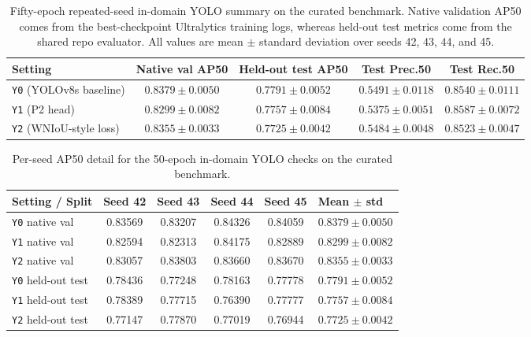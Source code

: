 \documentclass[10pt,a4paper]{article}
\begin{document}
\begin{table}[t]
  \centering
  \caption{Fifty-epoch repeated-seed in-domain YOLO summary on the curated benchmark. Native validation AP50 comes from the best-checkpoint Ultralytics training logs, whereas held-out test metrics come from the shared repo evaluator. All values are mean $\pm$ standard deviation over seeds 42, 43, 44, and 45.}
  \label{tab:app-curated-summary}
  \footnotesize
  \setlength{\tabcolsep}{4pt}
  \begin{tabularx}{\textwidth}{>{\raggedright\arraybackslash}p{} c c c c}
    \toprule
    Setting & Native val AP50 & Held-out test AP50 & Test Prec.50 & Test Rec.50 \\
    \midrule
    \texttt{Y0} (YOLOv8s baseline) & $0.8379 \pm 0.0050$ & $0.7791 \pm 0.0052$ & $0.5491 \pm 0.0118$ & $0.8540 \pm 0.0111$ \\
    \texttt{Y1} (P2 head) & $0.8299 \pm 0.0082$ & $0.7757 \pm 0.0084$ & $0.5375 \pm 0.0051$ & $0.8587 \pm 0.0072$ \\
    \texttt{Y2} (WNIoU-style loss) & $0.8355 \pm 0.0033$ & $0.7725 \pm 0.0042$ & $0.5484 \pm 0.0048$ & $0.8523 \pm 0.0047$ \\
    \bottomrule
  \end{tabularx}
\end{table}

\begin{table}[t]
  \centering
  \caption{Per-seed AP50 detail for the 50-epoch in-domain YOLO checks on the curated benchmark.}
  \label{tab:app-curated-perseed}
  \scriptsize
  \setlength{\tabcolsep}{4pt}
  \begin{tabularx}{\textwidth}{>{\raggedright\arraybackslash}p{} c c c c X}
    \toprule
    Setting / Split & Seed 42 & Seed 43 & Seed 44 & Seed 45 & Mean $\pm$ std \\
    \midrule
    \texttt{Y0} native val & 0.83569 & 0.83207 & 0.84326 & 0.84059 & $0.8379 \pm 0.0050$ \\
    \texttt{Y1} native val & 0.82594 & 0.82313 & 0.84175 & 0.82889 & $0.8299 \pm 0.0082$ \\
    \texttt{Y2} native val & 0.83057 & 0.83803 & 0.83660 & 0.83670 & $0.8355 \pm 0.0033$ \\
    \texttt{Y0} held-out test & 0.78436 & 0.77248 & 0.78163 & 0.77778 & $0.7791 \pm 0.0052$ \\
    \texttt{Y1} held-out test & 0.78389 & 0.77715 & 0.76390 & 0.77777 & $0.7757 \pm 0.0084$ \\
    \texttt{Y2} held-out test & 0.77147 & 0.77870 & 0.77019 & 0.76944 & $0.7725 \pm 0.0042$ \\
    \bottomrule
  \end{tabularx}
\end{table}
\end{document}
